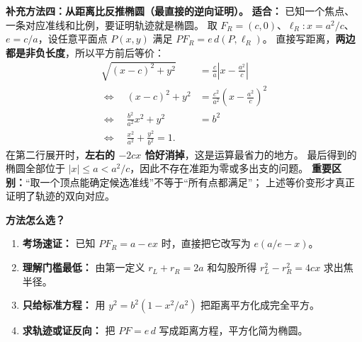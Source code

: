 \clearpage
\begin{proofbox}
\textbf{补充方法四：从距离比反推椭圆（最直接的逆向证明）。}
\textbf{适合：} 已知一个焦点、一条对应准线和比例，要证明轨迹就是椭圆。
取 $F_R=(c,0)$、$\ell_R:x=a^2/c$、$e=c/a$，设任意平面点 $P(x,y)$ 满足
$PF_R=e\,d(P,\ell_R)$。
直接写距离，\textbf{两边都是非负长度}，所以平方前后等价：
\[
\begin{aligned}
\sqrt{(x-c)^2+y^2}
 &=\frac ca\left|x-\frac{a^2}{c}\right|\\
\Longleftrightarrow\quad (x-c)^2+y^2
 &=\frac{c^2}{a^2}\left(x-\frac{a^2}{c}\right)^2\\
\Longleftrightarrow\quad \frac{b^2}{a^2}x^2+y^2&=b^2\\
\Longleftrightarrow\quad \boxed{\frac{x^2}{a^2}+\frac{y^2}{b^2}=1}.
\end{aligned}
\]
在第二行展开时，\textbf{左右的 $-2cx$ 恰好消掉}，这是运算最省力的地方。
最后得到的椭圆全部位于 $|x|\le a<a^2/c$，因此不存在准距为零或多出支的问题。
\textbf{重要区别：}“取一个顶点能确定候选准线”不等于“所有点都满足”；
上述等价变形才真正证明了轨迹的双向对应。

\medskip
\textbf{方法怎么选？}
\begin{enumerate}[leftmargin=*]
\item \textbf{考场速证：} 已知 $PF_R=a-ex$ 时，直接把它改写为 $e(a/e-x)$。
\item \textbf{理解门槛最低：} 由第一定义 $r_L+r_R=2a$ 和勾股所得 $r_L^2-r_R^2=4cx$ 求出焦半径。
\item \textbf{只给标准方程：} 用 $y^2=b^2(1-x^2/a^2)$ 把距离平方化成完全平方。
\item \textbf{求轨迹或证反向：} 把 $PF=e\,d$ 写成距离方程，平方化简为椭圆。
\end{enumerate}
\end{proofbox}
\clearpage

